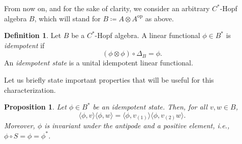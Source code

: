 \documentclass[a4paper,10pt]{amsart}
\newcommand{\eval}[2]{\langle #1 , #2\rangle}
\newcommand{\newterm}[1]{\emph{#1}}
\newtheorem{proposition}[theorem]{Proposition}
\theoremstyle{definition}
\newtheorem{definition}[theorem]{Definition}
\begin{document}
From now on, and for the sake of clarity, we consider an arbitrary $C^*$-Hopf algebra $B$, which will stand for $B \coloneqq  A\otimes A^{\mathrm{op}}$ as above.

\begin{definition}
	Let $B$ be a $C^*$-Hopf algebra. A linear functional $\phi\in B^*$ is \newterm{idempotent} if
	\[
        (\phi \otimes \phi) \circ \Delta_B = \phi.
	\]
    An \newterm{idempotent state} is a unital idempotent linear functional.
\end{definition}

Let us briefly state important properties that will be useful for this characterization.

\begin{proposition}\label{prop:IdempProp}
Let $\phi\in B^*$ be an idempotent state. Then, for all $v,w\in B$,
\begin{equation*}
    \eval{\phi}{v}
          \eval{\phi}{w}
    =
    \eval{\phi}{v_{(1)}}
          \eval{\phi}{v_{(2)}w}.
\end{equation*}
Moreover, $\phi$ is invariant under the antipode and a positive element, i.e., $\phi\circ S = \phi = \phi^*$.
\end{proposition}
\end{document}
